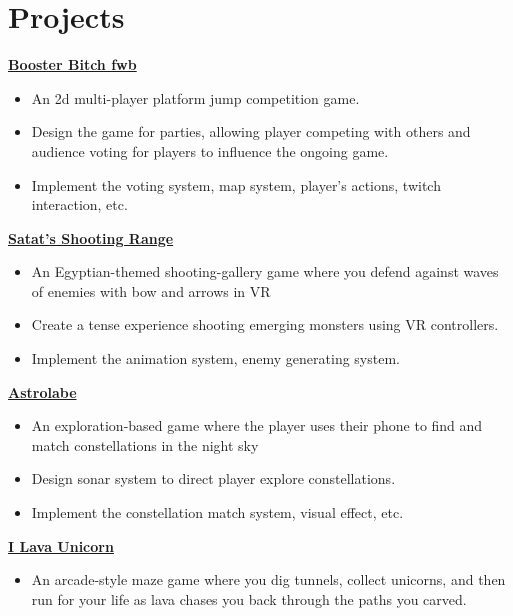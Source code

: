 \documentclass{article}
\begin{document}
{		\section{Projects}
		\vspace{5pt}
		\textbf{\href{http://www.plutoshe.com/blog/BoosterBitchfwb}{Booster Bitch fwb}} \hfill \quad
		
		\begin{itemize}
			\item An 2d multi-player platform jump competition game.
			\item Design the game for parties, allowing player competing with others and audience voting for players to influence the ongoing game. 
			\item Implement the voting system, map system, player's actions, twitch interaction, etc.
		\end{itemize}
	
		\textbf{\href{http://www.plutoshe.com/blog/Satat'sShootingRange}{Satat's Shooting Range}} \hfill \quad
		
		\begin{itemize}
			\item An Egyptian-themed shooting-gallery game where you defend against waves of enemies with bow and arrows in VR
			\item Create a tense experience shooting emerging monsters using VR controllers.
			\item Implement the animation system, enemy generating system.
		\end{itemize}
		
		
		\textbf{\href{http://www.plutoshe.com/blog/Astrolabe}{Astrolabe}} \hfill \quad
		
		\begin{itemize}
			\item An exploration-based game where the player uses their phone to find and match constellations in the night sky
			\item Design sonar system to direct player explore constellations.
	 	         \item  Implement the constellation match system, visual effect, etc.
			

		\end{itemize}
		
		
		
		\textbf{\href{http://www.plutoshe.com/blog/ILavaUnicorn}{I Lava Unicorn}} \hfill \quad
		
		\begin{itemize}
			\item An arcade-style maze game where you dig tunnels, collect unicorns, and then run for your life as lava chases you back through the paths you carved.
			

\end{itemize}}
\end{document}
